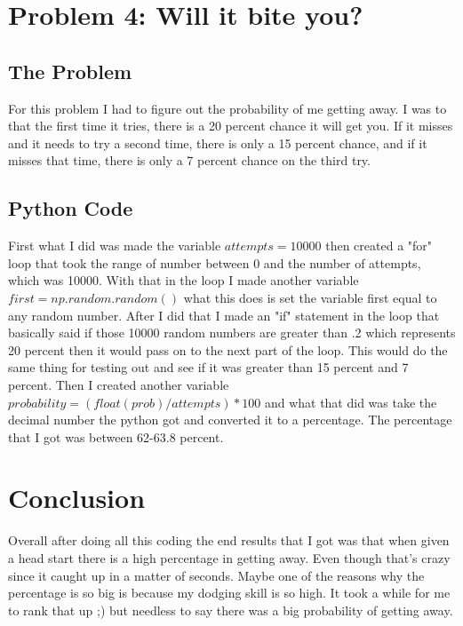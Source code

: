 \documentclass[twocolumn]{revtex4}
\begin{document}

\section{Problem 4: Will it bite you?}

\subsection{The Problem}
For this problem I had to figure out the probability of me getting away. I was to that the first time it tries, there is a 20 percent chance it will get you. If it misses and it needs to try a second time, there is only a 15 percent chance, and if it misses that time, there is only a 7 percent chance on the third try.

\subsection{Python Code}
First what I did was made the variable $attempts = 10000$ then created a "for" loop that took the range of number between 0 and the number of attempts, which was 10000. With that in the loop I made another variable $ first = np.random.random()$ what this does is set the variable first equal to any random number. After I did that I made an "if" statement in the loop that basically said if those 10000 random numbers are greater than .2 which represents 20 percent then it would pass on to the next part of the loop. This would do the same thing for testing out and see if it was greater than 15 percent and 7 percent. Then I created another variable $probability = (float(prob)/attempts) * 100$ and what that did was take the  decimal number the python got and converted it to a percentage. The percentage that I got was between 62-63.8 percent.
\section{Conclusion}
Overall after doing all this coding the end results that I got was that when given a head start there is a high percentage in getting away. Even though that's crazy since it caught up in a matter of seconds. Maybe one of the reasons why the percentage is so big is because my dodging skill is so high. It took a while for me to rank that up ;) but needless to say there was a big probability of getting away.
\end{document}
